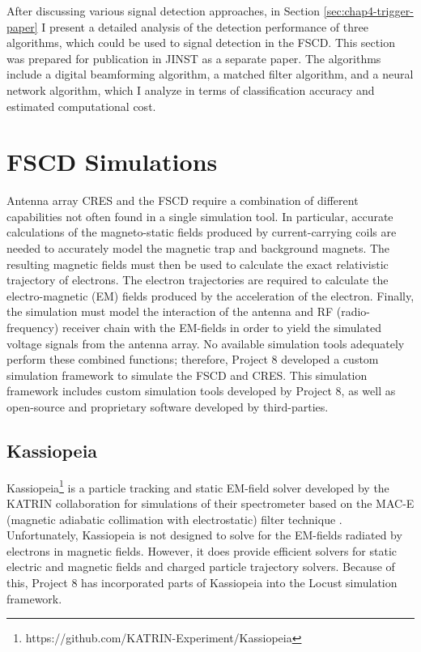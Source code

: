After discussing various signal detection approaches, in Section \ref{sec:chap4-trigger-paper} I present a detailed analysis of the detection performance of three algorithms, which could be used to signal detection in the FSCD. This section was prepared for publication in JINST as a separate paper. The algorithms include a digital beamforming algorithm, a matched filter algorithm, and a neural network algorithm, which I analyze in terms of classification accuracy and estimated computational cost.  

\section{FSCD Simulations}
\label{sec:chap4-simulations}

Antenna array CRES and the FSCD require a combination of different capabilities not often found in a single simulation tool. In particular, accurate calculations of the magneto-static fields produced by current-carrying coils are needed to accurately model the magnetic trap and background magnets. The resulting magnetic fields must then be used to calculate the exact relativistic trajectory of electrons. The electron trajectories are required to calculate the electro-magnetic (EM) fields produced by the acceleration of the electron. Finally, the simulation must model the interaction of the antenna and RF (radio-frequency) receiver chain with the EM-fields in order to yield the simulated voltage signals from the antenna array. No available simulation tools adequately perform these combined functions; therefore, Project 8 developed a custom simulation framework to simulate the FSCD and CRES. This simulation framework includes custom simulation tools developed by Project 8, as well as open-source and proprietary software developed by third-parties.

\subsection{Kassiopeia}

Kassiopeia\footnote{https://github.com/KATRIN-Experiment/Kassiopeia} is a particle tracking and static EM-field solver developed by the KATRIN collaboration for simulations of their spectrometer based on the MAC-E (magnetic adiabatic collimation with electrostatic) filter technique \cite{kassiopeia}. Unfortunately, Kassiopeia is not designed to solve for the EM-fields radiated by electrons in magnetic fields. However, it does provide efficient solvers for static electric and magnetic fields and charged particle trajectory solvers. Because of this, Project 8 has incorporated parts of Kassiopeia into the Locust simulation framework. 

